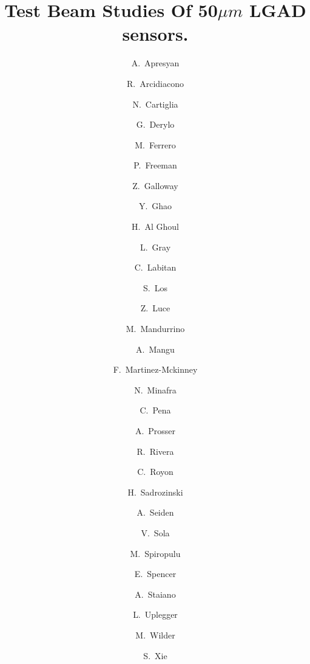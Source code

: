 \documentclass[preprint,1p]{elsarticle}
\begin{document}
\linenumbers

\begin{frontmatter}



\title{Test Beam Studies Of 50$\mu m$ LGAD sensors.}


\author[1]{A.~Apresyan}
\author[5]{R.~Arcidiacono}
\author[5]{N.~Cartiglia}
\author[1]{G.~Derylo}
\author[5]{M.~Ferrero}
\author[4]{P.~Freeman}
\author[4]{Z.~Galloway}
\author[4]{Y.~Ghao}
\author[3]{H.~Al Ghoul}
\author[1]{L.~Gray}
\author[4]{C.~Labitan}
\author[1]{S.~Los}
\author[4]{Z.~Luce}
\author[5]{M.~Mandurrino}
\author[2]{A.~Mangu}
\author[4]{F.~Martinez-Mckinney}
\author[3]{N.~Minafra}
\author[2]{C.~Pena}
\author[1]{A.~Prosser}
\author[1]{R.~Rivera}
\author[3]{C.~Royon}
\author[4]{H.~Sadrozinski}
\author[4]{A.~Seiden}
\author[5]{V.~Sola}
\author[2]{M.~Spiropulu}
\author[4]{E.~Spencer}
\author[5]{A.~Staiano}
\author[1]{L.~Uplegger}
\author[4]{M.~Wilder}
\author[2]{S.~Xie}

\address[1]{Fermi National Accelerator Laboratory, Batavia, IL, USA}
\address[2]{California Institute of Technology, Pasadena, CA, USA}
\address[3]{University of Kansas, KS, USA}
\address[4]{SCIPP, University of California Santa Cruz, CA, USA}
\address[5]{Università di Torino, Torino, Italy}



\end{frontmatter}
\end{document}
